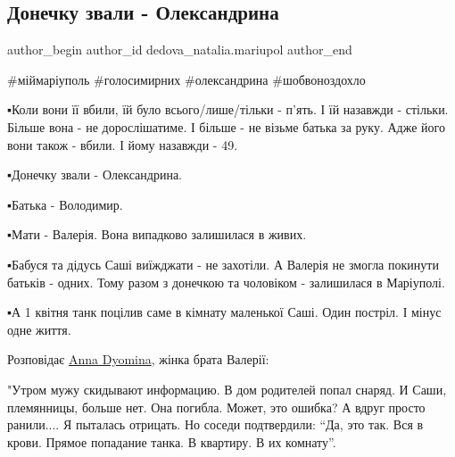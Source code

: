  
 
 
 
 

\subsection{Донечку звали - Олександрина}
\label{sec:31_01_2023.fb.dedova_natalia.mariupol.2.donechku_zvali___ole}

\ifcmt
 author_begin
   author_id dedova_natalia.mariupol
 author_end
\fi

\obeycr
\#міймаріуполь
\#голосимирних
\#олександрина
\#шобвоноздохло
\restorecr

▪️Коли вони її вбили, їй було всього/лише/тільки - п'ять. І їй назавжди -
стільки. Більше вона - не дорослішатиме. І більше - не візьме батька за руку.
Адже його вони також - вбили. І йому назавжди - 49. 

▪️Донечку звали - Олександрина. 

▪️Батька - Володимир.

▪️Мати - Валерія. Вона випадково залишилася в живих.

▪️Бабуся та дідусь Саші виїжджати - не захотіли. А Валерія не змогла покинути
батьків - одних. Тому разом з донечкою та чоловіком - залишилася в Маріуполі. 

▪️А 1 квітня танк поцілив саме в кімнату маленької Саші. Один постріл. І мінус
одне життя. 

Розповідає \href{https://www.facebook.com/anna.dyomina.90}{Anna Dyomina}, жінка брата Валерії:

"Утром мужу скидывают информацию. В дом родителей попал снаряд. И Саши,
племянницы, больше нет. Она погибла. Может, это ошибка? А вдруг просто
ранили.... Я пыталась отрицать. Но соседи подтвердили: \enquote{Да, это так. Вся в
крови. Прямое попадание танка. В квартиру. В их комнату}. 

